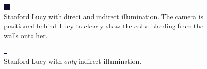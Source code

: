 \documentclass{acmsiggraph}               %
\begin{document}
\begin{figure}[p]
    \centering
    \includegraphics[width=1.0\columnwidth]{./images/p2-B.png}
    \caption{Stanford Lucy with direct and indirect illumination. The camera is positioned behind Lucy to clearly show the color bleeding from the walls onto her.}
    \label{fig:ang2}
\end{figure}

\begin{figure}[p]
    \centering
    \includegraphics[width=1.0\columnwidth]{./images/p2-gi-exp.png}
    \caption{Stanford Lucy with \emph{only} indirect illumination.}
    \label{fig:ang3}
\end{figure}



\cite{VSM2006,RSM2005,GGGauss07,GGVSM07,FSAT05}



\end{document}
